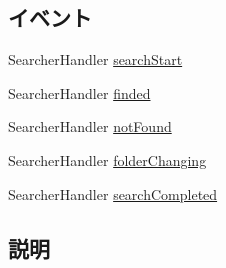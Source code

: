 \subsection*{イベント}
\begin{DoxyCompactItemize}
\item 
SearcherHandler \hyperlink{classlazurite_1_1util_1_1searching_1_1_file_searcher_ex_a60a46ddddadd3eacfdc765e467c2583c}{searchStart}
\item 
SearcherHandler \hyperlink{classlazurite_1_1util_1_1searching_1_1_file_searcher_ex_a8230aa9c4e9d1cb9e0d5098692986b18}{finded}
\item 
SearcherHandler \hyperlink{classlazurite_1_1util_1_1searching_1_1_file_searcher_ex_ac22944b2f2578ef04bd9e233a0ca2a2d}{notFound}
\item 
SearcherHandler \hyperlink{classlazurite_1_1util_1_1searching_1_1_file_searcher_ex_a666b37d0438a9574a72240b6cea7c2ca}{folderChanging}
\item 
SearcherHandler \hyperlink{classlazurite_1_1util_1_1searching_1_1_file_searcher_ex_a68148235f69ad9ff76a9bf3a6b1a9aab}{searchCompleted}
\end{DoxyCompactItemize}


\subsection{説明}


